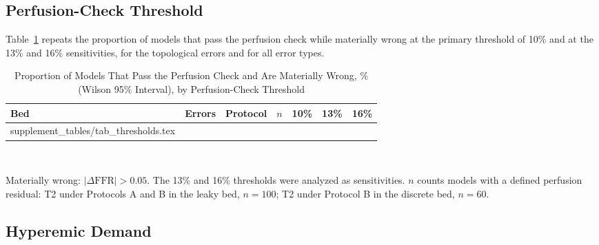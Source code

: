 \documentclass[journal,twoside,web,onecolumn]{ieeecolor}
\begin{document}
\subsection{Perfusion-Check Threshold}
Table~\ref{tab:thr} repeats the proportion of models that pass the perfusion check while materially wrong at the
primary threshold of 10\% and at the 13\% and 16\% sensitivities, for the topological errors and for all error
types.
\begin{table}[!ht]
\caption{Proportion of Models That Pass the Perfusion Check and Are Materially Wrong, \% (Wilson 95\% Interval), by
Perfusion-Check Threshold}\label{tab:thr}
\centering\small
\begin{tabular}{@{}lllrccc@{}}
\toprule
Bed & Errors & Protocol & $n$ & 10\% & 13\% & 16\%\\
\midrule
{} supplement_tables/tab_thresholds.tex 
\bottomrule
\end{tabular}
\\[3pt]
\parbox{0.85\textwidth}{\footnotesize Materially wrong: $|\Delta\mathrm{FFR}| > 0.05$. The 13\% and 16\% thresholds were analyzed as sensitivities. $n$ counts models with a
defined perfusion residual: T2 under Protocols A and B in the leaky bed, $n = 100$; T2 under Protocol B in the
discrete bed, $n = 60$.}
\end{table}

\FloatBarrier
\subsection{Hyperemic Demand}\label{sec:demand}


\FloatBarrier
\end{document}

